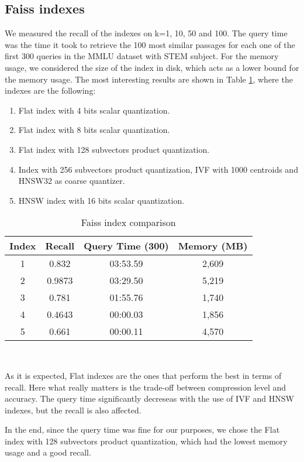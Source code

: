 \documentclass[11pt]{article}
\begin{document}
\subsection{Faiss indexes}

We measured the recall of the indexes on k=1, 10, 50 and 100. The query time was 
the time it took to retrieve the 100 most similar passages for each one of the first 300
queries in the MMLU dataset with STEM subject. 
For the memory usage, we considered the size of the index in disk, which acts as a lower
bound for the memory usage.
The most interesting results are shown in Table \ref{tab:faiss-index}, where the indexes 
are the following:

\begin{enumerate}
    \item Flat index with 4 bits scalar quantization.
    \item Flat index with 8 bits scalar quantization.
    \item Flat index with 128 subvectors product quantization. 
    \item Index with 256 subvectors product quantization, IVF with 1000 centroids
    and HNSW32 as coarse quantizer.
    \item HNSW index with 16 bits scalar quantization.
\end{enumerate}

\begin{table}[h]
\centering
\begin{tabular}{|c|c|c|c|}
\hline
Index & Recall & Query Time (300) & Memory (MB) \\
\hline
1 & 0.832 & 03:53.59 & 2,609 \\
2 & 0.9873 & 03:29.50 & 5,219 \\
3 & 0.781 & 01:55.76 & 1,740 \\
4 & 0.4643 & 00:00.03 & 1,856 \\
5 & 0.661 & 00:00.11 & 4,570 \\
\hline
\end{tabular}
\caption{Faiss index comparison}
\
\label{tab:faiss-index}
\end{table}

As it is expected, Flat indexes are the ones that perform the best in terms of recall.
Here what really matters is the trade-off between compression level and accuracy.
The query time significantly decreseas with the use of IVF and HNSW indexes, but the recall
is also affected.

In the end, since the query time was fine for our purposes, we chose the Flat index with 128
subvectors product quantization, which had the lowest memory usage and a good recall.
\end{document}

